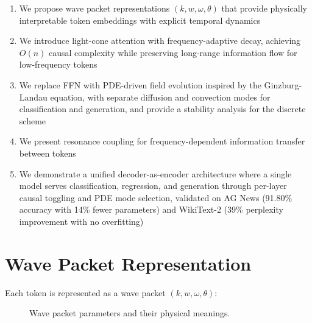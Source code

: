 \documentclass{article}
\begin{document}
\begin{enumerate}
\item We propose wave packet representations $(k, w, \omega, \theta)$ that provide physically interpretable token embeddings with explicit temporal dynamics
\item We introduce light-cone attention with frequency-adaptive decay, achieving $O(n)$ causal complexity while preserving long-range information flow for low-frequency tokens
\item We replace FFN with PDE-driven field evolution inspired by the Ginzburg-Landau equation, with separate diffusion and convection modes for classification and generation, and provide a stability analysis for the discrete scheme
\item We present resonance coupling for frequency-dependent information transfer between tokens
\item We demonstrate a unified decoder-as-encoder architecture where a single model serves classification, regression, and generation through per-layer causal toggling and PDE mode selection, validated on AG News (91.80\% accuracy with 14\% fewer parameters) and WikiText-2 (39\% perplexity improvement with no overfitting)
\end{enumerate}

\section{Wave Packet Representation}

Each token is represented as a wave packet $(k, w, \omega, \theta)$:

\begin{figure}[t]
\centering
{}
\caption{Wave packet parameters and their physical meanings.}
\label{fig:wave-packet}
\end{figure}
\end{document}
